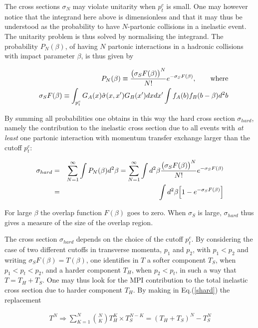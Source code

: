 \documentclass{ws-rv9x6}
\begin{document}
The cross sections $\sigma_N$ may violate unitarity when $p_t^c$ is small. One may however notice that the integrand here above is dimensionless and that it may thus be understood as the probability to have 
$N$-partonic collisions in a inelastic event. The unitarity
problem is thus solved by normalising the integrand. The 
probability $P_N(\beta)$, of having $N$ partonic
interactions in a hadronic collisions with impact parameter $\beta$, is thus given by

\begin{eqnarray}\label{prob}
&&P_N(\beta)\equiv{\bigl(\sigma_SF(\beta)\bigr)^N\over N!} e^{-\sigma_SF(\beta)},\qquad{\rm where}\\
&&\sigma_SF(\beta)\equiv\int_{p_t^c} G_A(x)\hat{\sigma}(x,x')G_B(x')dxdx'\int f_A(b)f_B(b-\beta)d^2b
\nonumber
\end{eqnarray}

By summing all probabilities one obtains in this way the hard cross section
$\sigma_{hard}$, namely the contribution to the inelastic cross
section due to all events with {\it at least} one partonic interaction
with momentum transfer exchange larger than the cutoff $p_t^c$:

\begin{eqnarray}\label{shard}
\sigma_{hard}&=&\sum_{N=1}^{\infty}\int P_N(\beta)d^2\beta =\sum_{N=1}^{\infty}\int d^2\beta{\bigl(\sigma_SF(\beta)\bigr)^N\over N!}
 e^{-\sigma_SF(\beta)}\cr
 &=&\int d^2\beta\Bigl[1-e^{-\sigma_SF(\beta)}\Bigr]
\end{eqnarray}

\noindent
For large $\beta$ the overlap function $F(\beta)$ goes to zero. When $\sigma_S$ is large, $\sigma_{hard}$ thus gives a measure of the size of the overlap region. 

The cross section $\sigma_{hard}$ depends on the choice of the cutoff $p_t^c$. By considering the case of two different cutoffs in transverse momenta, $p_1$ and $p_2$, with $p_1<p_2$ and writing $\sigma_SF(\beta)=T(\beta)$, one identifies in $T$ a softer component $T_S$, when $p_1<p_t<p_2$, and a harder component $T_H$, when $p_2<p_t$, in such a way that $T=T_H+T_S$. One may thus look for the MPI contribution to the total inelastic cross section due to harder component $T_H$. By making in Eq.(\ref{shard}) the replacement

\begin{eqnarray}
T^N\Rightarrow\sum_{K=1}^{N}{{N}\choose{K}}T_H^K\times T_S^{N-K}=(T_H+T_S)^N-T_S^N\nonumber
\end{eqnarray}
\end{document}
